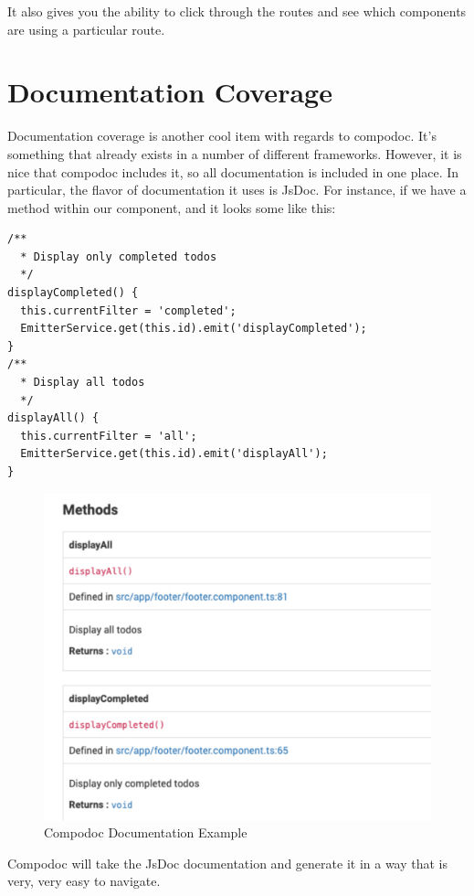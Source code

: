 It also gives you the ability to click through the routes and see which components are using a particular route.

\section{Documentation Coverage}
Documentation coverage is another cool item with regards to compodoc. It's something that already exists in a number of different frameworks. However, it is nice that compodoc includes it, so all documentation is included in one place. In particular, the flavor of documentation it uses is JsDoc. For instance, if we have a method within our component, and it looks some like this: 
\begin{lstlisting}
/**
  * Display only completed todos
  */
displayCompleted() {
  this.currentFilter = 'completed';
  EmitterService.get(this.id).emit('displayCompleted');
}
/**
  * Display all todos
  */
displayAll() {
  this.currentFilter = 'all';
  EmitterService.get(this.id).emit('displayAll');
}
\end{lstlisting}

\begin{figure}[!ht]
\caption{Compodoc Documentation Example}
\includegraphics[width=414pt]{graphics/compodoc/documentation/documentation-coverage.pdf}
\end{figure}

Compodoc will take the JsDoc documentation and generate it in a way that is very, very easy to navigate. 

